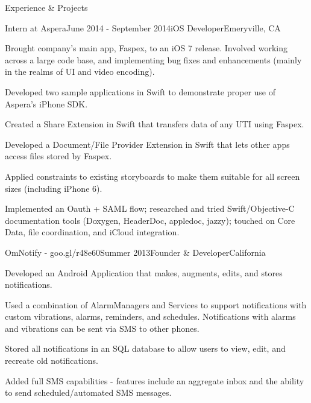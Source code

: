 \documentclass{resume} %
\begin{document}

\begin{rSection}{Experience \& Projects}

\begin{rSubsection}{Intern at Aspera}{June 2014 - September 2014}{iOS Developer}{Emeryville, CA}
\item Brought company's main app, Faspex, to an iOS 7 release. Involved working across
    a large code base, and implementing bug fixes and enhancements (mainly in the
    realms of UI and video encoding).
\item Developed two sample applications in Swift to demonstrate proper use of Aspera's iPhone
    SDK.
\item Created a Share Extension in Swift that transfers data of any UTI using Faspex.
\item Developed a Document/File Provider Extension in Swift that
    lets other apps access files stored by Faspex.
\item Applied constraints to existing storyboards to make them suitable for all
    screen sizes (including iPhone 6).
\item Implemented an Oauth + SAML flow; researched and tried Swift/Objective-C
    documentation tools (Doxygen, HeaderDoc, appledoc, jazzy); touched on Core Data, file
    coordination, and iCloud integration.
\end{rSubsection}


\begin{rSubsection}{OmNotify - goo.gl/r48e60}{Summer 2013}{Founder \& Developer}{California}
\item Developed an Android Application that makes, augments, edits, and stores notifications.
\item Used a combination of AlarmManagers and Services to support notifications with
    custom vibrations, alarms, reminders, and schedules. Notifications with alarms and
    vibrations can be sent via SMS to other phones.
\item Stored all notifications in an SQL database to allow users to view, edit, and recreate
    old notifications.
\item Added full SMS capabilities - features include an aggregate inbox and the ability
    to send scheduled/automated SMS messages.
\end{rSubsection}


\end{rSection}
\end{document}
